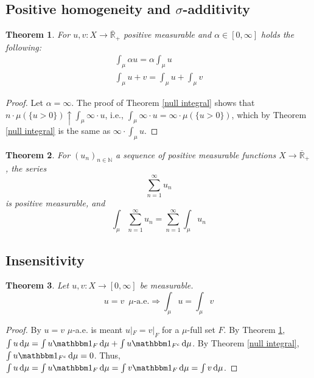 \documentclass[11pt, a4paper, openany]{book}
\newtheorem{thm}{Theorem}\newtheorem{lem}{Lemma}\newtheorem{crl}{Corollary}
\theoremstyle{definition}
\newcommand{\er}{\overline{\mathbb{R}}}
\begin{document}
\subsection{Positive homogeneity and \texorpdfstring{$\sigma$}{sigma}-additivity}
    \begin{thm}\label{properties of integral of positive measurable functions}
        For $u,v:X\rightarrow \er_+$ positive measurable and $\alpha\in [0,\infty]$ holds the following:
        \begin{gather*}
            \int_\mu \alpha u=\alpha \int_\mu u\\
            \int_\mu u+v=\int_\mu u+\int_\mu v
        \end{gather*}
    \end{thm}
    \begin{proof}
        Let $\alpha=\infty$. The proof of Theorem \ref{null integral} shows that $n\cdot \mu(\{u>0\})\uparrow \int_\mu\infty\cdot u$, i.e., $\int_\mu \infty\cdot u=\infty\cdot \mu(\{u>0\})$, which by Theorem \ref{null integral} is the same as $\infty\cdot \int_\mu u$.
    \end{proof}
    \begin{thm}\label{integral of a series}
        For $(u_n)_{n\in\mathbb{N}}$ a sequence of positive measurable functions $X\rightarrow \er_+$, the series
        \[
            \sum_{n=1}^\infty u_n
        \]
        is positive measurable, and
        \[
            \int_\mu \sum_{n=1}^\infty u_n=\sum_{n=1}^\infty \int_\mu u_n
        \]
    \end{thm}
\subsection{Insensitivity}
    \begin{thm}\label{integrals of a.e. equal positive measurable functions}
        Let $u,v:X\rightarrow [0,\infty]$ be measurable.
        \[
            u=v\,\,\,\mu\text{-a.e.}\Longrightarrow \int_\mu u=\int_\mu v
        \]
    \end{thm}
    \begin{proof}
        By $u=v$ $\mu$-a.e. is meant $u|_F=v|_F$ for a $\mu$-full set $F$. By Theorem \ref{properties of integral of positive measurable functions}, $\int u\odif\mu=\int u\one_F\odif\mu+\int u\one_{F^c}\odif\mu$. By Theorem \ref{null integral}, $\int u\one_{F^c}\odif\mu=0$. Thus, $\int u\odif\mu=\int u\one_F\odif\mu=\int v\one_F\odif\mu=\int v\odif\mu$.
    \end{proof}
\end{document}
